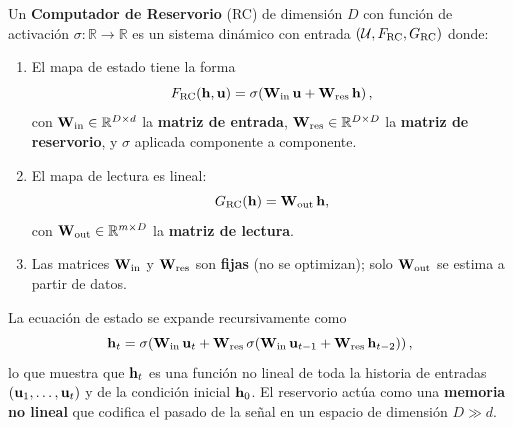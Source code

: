 \begin{definition}
\label{def:computador_reservorio}
Un \textbf{Computador de Reservorio} (RC) de dimensión $D$ con
función de activación $\sigma: \mathbb{R} \to \mathbb{R}$ es un
sistema dinámico con entrada $(\mathcal{U}, F_{\text{RC}}, G_{\text{RC}})$
donde:
\begin{enumerate}
    \item El mapa de estado tiene la forma
    \begin{equation}
        F_{\text{RC}}(\mathbf{h}, \mathbf{u}) =
        \sigma\!\left(\mathbf{W}_{\text{in}}\,\mathbf{u} +
        \mathbf{W}_{\text{res}}\,\mathbf{h}\right),
        \label{eq:mapa_estado_rc}
    \end{equation}
    con $\mathbf{W}_{\text{in}} \in \mathbb{R}^{D \times d}$ la
    \textbf{matriz de entrada},
    $\mathbf{W}_{\text{res}} \in \mathbb{R}^{D \times D}$ la
    \textbf{matriz de reservorio}, y $\sigma$ aplicada
    componente a componente.
    \item El mapa de lectura es lineal:
    \begin{equation}
        G_{\text{RC}}(\mathbf{h}) = \mathbf{W}_{\text{out}}\,\mathbf{h},
        \label{eq:mapa_lectura_rc}
    \end{equation}
    con $\mathbf{W}_{\text{out}} \in \mathbb{R}^{m \times D}$ la
    \textbf{matriz de lectura}.
    \item Las matrices $\mathbf{W}_{\text{in}}$ y
    $\mathbf{W}_{\text{res}}$ son \textbf{fijas} (no se optimizan);
    solo $\mathbf{W}_{\text{out}}$ se estima a partir de datos.
\end{enumerate}
\end{definition}

La ecuación de estado se expande recursivamente como
\begin{equation}
    \mathbf{h}_t = \sigma\!\left(\mathbf{W}_{\text{in}}\,\mathbf{u}_t +
    \mathbf{W}_{\text{res}}\,
    \sigma\!\left(\mathbf{W}_{\text{in}}\,\mathbf{u}_{t-1} +
    \mathbf{W}_{\text{res}}\,\mathbf{h}_{t-2}\right)\right),
    \label{eq:expansion_recursiva}
\end{equation}
lo que muestra que $\mathbf{h}_t$ es una función no lineal de toda la
historia de entradas $(\mathbf{u}_1, \ldots, \mathbf{u}_t)$ y de la
condición inicial $\mathbf{h}_0$.  El reservorio actúa como una
\textbf{memoria no lineal} que codifica el pasado de la señal en un
espacio de dimensión $D \gg d$.

